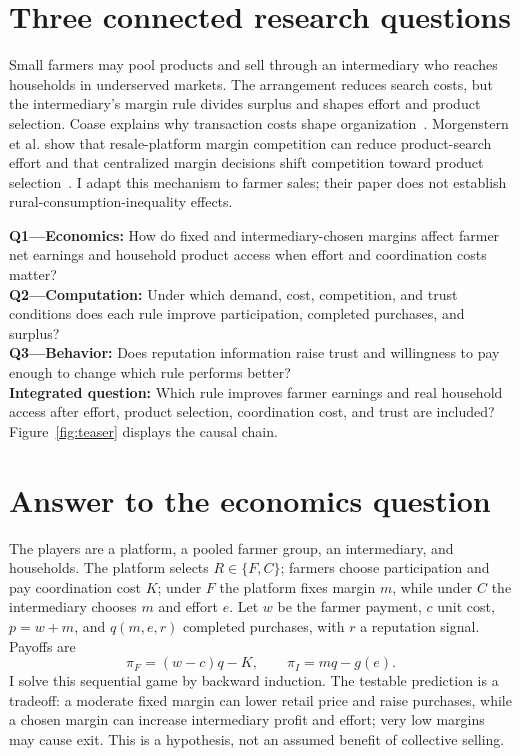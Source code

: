 \section{Three connected research questions}
Small farmers may pool products and sell through an intermediary who reaches households in underserved markets. The arrangement reduces search costs, but the intermediary's margin rule divides surplus and shapes effort and product selection. Coase explains why transaction costs shape organization~\cite{coase1937,nobelcoase1991}. Morgenstern et al. show that resale-platform margin competition can reduce product-search effort and that centralized margin decisions shift competition toward product selection~\cite{morgenstern2025}. I adapt this mechanism to farmer sales; their paper does not establish rural-consumption-inequality effects.

\textbf{Q1---Economics:} How do fixed and intermediary-chosen margins affect farmer net earnings and household product access when effort and coordination costs matter?\\
\textbf{Q2---Computation:} Under which demand, cost, competition, and trust conditions does each rule improve participation, completed purchases, and surplus?\\
\textbf{Q3---Behavior:} Does reputation information raise trust and willingness to pay enough to change which rule performs better?\\
\textbf{Integrated question:} Which rule improves farmer earnings and real household access after effort, product selection, coordination cost, and trust are included? Figure~\ref{fig:teaser} displays the causal chain.

\section{Answer to the economics question}
The players are a platform, a pooled farmer group, an intermediary, and households. The platform selects $R\in\{F,C\}$; farmers choose participation and pay coordination cost $K$; under $F$ the platform fixes margin $m$, while under $C$ the intermediary chooses $m$ and effort $e$. Let $w$ be the farmer payment, $c$ unit cost, $p=w+m$, and $q(m,e,r)$ completed purchases, with $r$ a reputation signal. Payoffs are
\[\pi_F=(w-c)q-K,\qquad \pi_I=mq-g(e).\]
I solve this sequential game by backward induction. The testable prediction is a tradeoff: a moderate fixed margin can lower retail price and raise purchases, while a chosen margin can increase intermediary profit and effort; very low margins may cause exit. This is a hypothesis, not an assumed benefit of collective selling.

